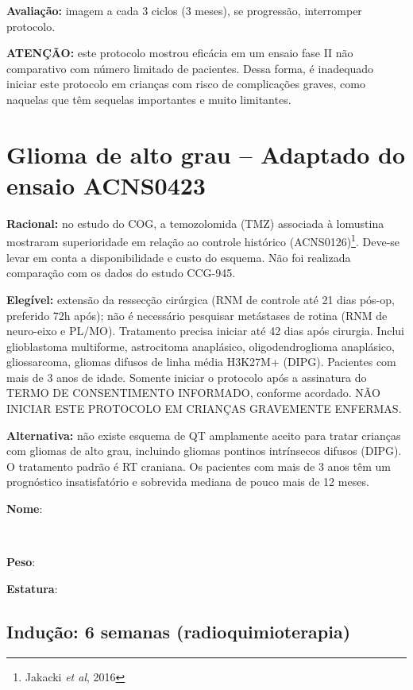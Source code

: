 \documentclass[11pt,a4paper,oldfontcommands]{memoir}
\def\entrywithlabel[#1]#2{\parbox{#1}{{\small #2:} \hrulefill}}
\begin{document}
\textbf{Avaliação:} imagem a cada 3 ciclos (3 meses), se progressão, interromper protocolo.

\textbf{ATENÇÃO:} este protocolo mostrou eficácia em um ensaio fase II não comparativo com número limitado de pacientes. Dessa forma, é inadequado iniciar este protocolo em crianças com risco de complicações graves, como naquelas que têm sequelas importantes e muito limitantes.

\cleardoublepage

\section{Glioma de alto grau -- Adaptado do ensaio ACNS0423}
{\let\thefootnote\relax{}}
\textbf{Racional:} no estudo do COG, a temozolomida (TMZ) associada à lomustina mostraram superioridade em relação ao controle histórico (ACNS0126)\footnote{Jakacki \textit{et al}, 2016}. Deve-se levar em conta a disponibilidade e custo do esquema. Não foi realizada comparação com os dados do estudo CCG-945.

\textbf{Elegível:} extensão da ressecção cirúrgica (RNM de controle até 21 dias pós-op, preferido 72h após); não é necessário pesquisar metástases de rotina (RNM de neuro-eixo e PL/MO). Tratamento precisa iniciar até 42 dias após cirurgia. Inclui glioblastoma multiforme, astrocitoma anaplásico, oligodendroglioma anaplásico, gliossarcoma, gliomas difusos de linha média H3K27M+ (DIPG). Pacientes com mais de 3 anos de idade. Somente iniciar o protocolo após a assinatura do TERMO DE CONSENTIMENTO INFORMADO, conforme acordado. NÃO INICIAR ESTE PROTOCOLO EM CRIANÇAS GRAVEMENTE ENFERMAS.

\textbf{Alternativa:} não existe esquema de QT amplamente aceito para tratar crianças com gliomas de alto grau, incluindo gliomas pontinos intrínsecos difusos (DIPG). O tratamento padrão é RT craniana. Os pacientes com mais de 3 anos têm um prognóstico insatisfatório e sobrevida mediana de pouco mais de 12 meses.
\\[0.4cm]
\entrywithlabel[1\hsize]{\textbf{Nome}}\hfill
\\[0.3cm]
\entrywithlabel[.45\hsize]{\textbf{Peso}}\hfill  \entrywithlabel[.45\hsize]{\textbf{Estatura}}

\subsection{Indução: 6 semanas (radioquimioterapia)}
\end{document}
